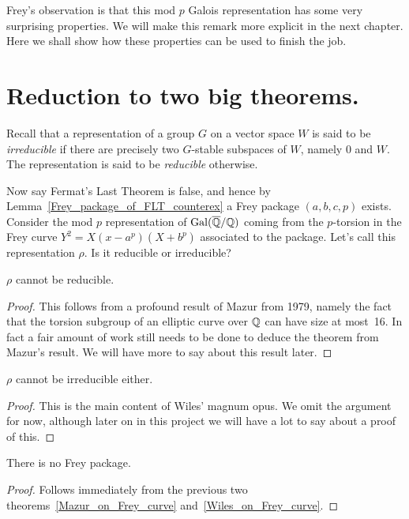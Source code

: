 Frey's observation is that this mod $p$ Galois representation has some very surprising properties. We will make this remark more explicit in the next chapter. Here we shall show how these properties can be used to finish the job.

\section{Reduction to two big theorems.}
  
Recall that a representation of a group $G$ on a vector space $W$ is said to be \emph{irreducible} if there are precisely two $G$-stable subspaces of $W$, namely $0$ and $W$. The representation is said to be \emph{reducible} otherwise.

Now say Fermat's Last Theorem is false, and hence by Lemma~\ref{Frey_package_of_FLT_counterex} a Frey package $(a,b,c,p)$ exists.  Consider the mod $p$ representation of $\operatorname{Gal}(\overline{\mathbb{Q}}/\mathbb{Q})$ coming from the $p$-torsion in the Frey curve $Y^2=X(x-a^p)(X+b^p)$ associated to the package. Let's call this representation $\rho$. Is it reducible or irreducible?

\begin{theorem}[Mazur]\label{Mazur_on_Frey_curve}\leanok $\rho$ cannot be reducible.\end{theorem}
\begin{proof}\tangled This follows from a profound result of Mazur \cite{mazur} from 1979, namely the fact that the torsion subgroup of an elliptic curve over $\mathbb{Q}$ can have size at most~16. In fact a fair amount of work still needs to be done to deduce the theorem from Mazur's result. We will have more to say about this result later.
\end{proof}

\begin{theorem}\label{Wiles_on_Frey_curve}\leanok $\rho$ cannot be irreducible either.\end{theorem}
\begin{proof}\tangled This is the main content of Wiles' magnum opus. We omit the argument for now, although later on in this project we will have a lot to say about a proof of this.
\end{proof}

\begin{corollary}\label{no_Frey_package}\leanok There is no Frey package.\end{corollary}
\begin{proof}\leanok Follows immediately from the previous two theorems~\ref{Mazur_on_Frey_curve} and~\ref{Wiles_on_Frey_curve}.\end{proof}

